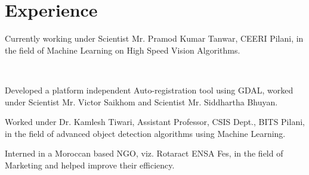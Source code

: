 \documentclass[]{font}
\begin{document}
\hfill
\begin{minipage}[t]{0.66\textwidth} 


\section{Experience}

\vspace{\topsep} %
\begin{tightemize}
\item Currently working under Scientist Mr. Pramod Kumar Tanwar, CEERI Pilani, in the field of Machine Learning on High Speed Vision Algorithms.
\end{tightemize}
\sectionsep

\\
\begin{tightemize}\item Developed a platform independent Auto-registration tool using GDAL, worked under Scientist Mr. Victor Saikhom and Scientist Mr. Siddhartha Bhuyan.
\end{tightemize}
\sectionsep

\begin{tightemize}
\item Worked under Dr. Kamlesh Tiwari, Assistant Professor, CSIS Dept., BITS Pilani, in the field of advanced object detection algorithms using Machine Learning.
\end{tightemize}
\sectionsep

\begin{tightemize}
\item Interned in a Moroccan based NGO, viz. Rotaract ENSA Fes, in the field of Marketing and helped improve their efficiency. 
\end{tightemize}
\sectionsep





\end{minipage}
\end{document}
